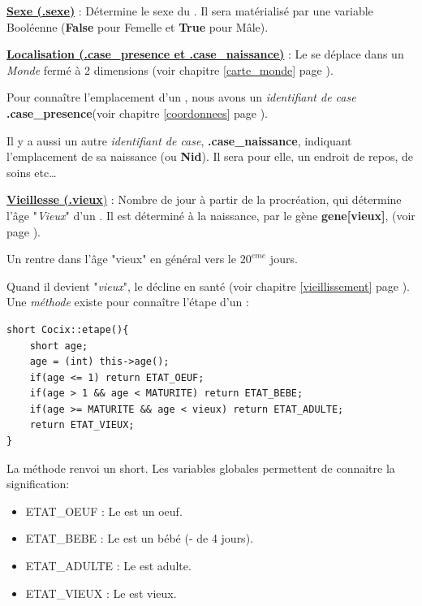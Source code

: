 \documentclass[french]{report}
\begin{document}
\begin{description}
\item[]\textbf{\underline{Sexe (.sexe)} }: Détermine le sexe du \CoCiX. Il sera matérialisé par une variable Booléenne (\textbf{False} pour Femelle et \textbf{True} pour Mâle).\\ 

\item \textbf{\underline{Localisation (.case\_presence et .case\_naissance)}} :  Le \CoCiX se déplace dans un \textit{Monde} fermé à 2 dimensions (voir chapitre \ref{carte_monde} page \pageref{carte_monde}).

Pour connaître l'emplacement d'un \CoCiX, nous avons un \textit{identifiant de case} \textbf{.case\_presence}(voir chapitre \ref{coordonnees} page \pageref{coordonnees}).

Il y a aussi un autre \textit{identifiant de case}, \textbf{.case\_naissance}, indiquant l'emplacement de sa naissance (ou \textbf{Nid}). Il sera pour elle, un endroit de repos, de soins etc\dots \label{nid}\\

\item \underline{\textbf{Vieillesse (.vieux})} : Nombre de jour à partir de la procréation, qui détermine l'âge  "\textit{Vieux}" d'un \CoCiX. \label{vieillesse}
Il est déterminé à la naissance, par le gène \textbf{gene[vieux]}, (voir page \pageref{liste_gene}).

Un \CoCiX rentre dans l'âge "vieux" en général vers le $20^{eme}$ jours.

Quand il devient "\emph{vieux}", le \CoCiX décline en santé (voir chapitre \ref{vieillissement} page \pageref{vieillissement}).\\
Une \emph{méthode} existe pour connaître l'étape d'un \CoCiX : \\

\begin{lstlisting}
short Cocix::etape(){
	short age;
	age = (int) this->age();
	if(age <= 1) return ETAT_OEUF;
	if(age > 1 && age < MATURITE) return ETAT_BEBE;
	if(age >= MATURITE && age < vieux) return ETAT_ADULTE;
	return ETAT_VIEUX;
}
\end{lstlisting}	
\end{description}
La méthode renvoi un short. Les variables globales permettent de connaitre la signification:
\begin{itemize}
	\item ETAT\_OEUF : Le \CoCiX est un oeuf.
	\item ETAT\_BEBE : Le \CoCiX est un bébé (- de 4 jours).
	\item ETAT\_ADULTE : Le \CoCiX est adulte.
	\item ETAT\_VIEUX : Le \CoCiX est vieux. 
\end{itemize} 
\end{document}
